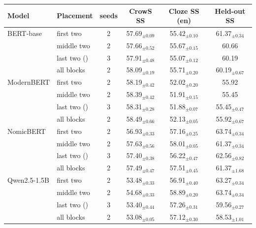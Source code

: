   \footnotesize\setlength{\tabcolsep}{4pt}
  \begin{tabular}{@{}llcccc@{}}
    \toprule
    Model & Placement & seeds & CrowS SS & Cloze SS (en) & Held-out SS \\
    \midrule
    BERT-base & first two & 2 & 57.69$_{\pm 0.09}$ & 55.42$_{\pm 0.10}$ & 61.37$_{\pm 0.34}$ \\
     & middle two & 2 & 57.66$_{\pm 0.52}$ & 55.67$_{\pm 0.15}$ & 60.66 \\
     & last two (\PEAT{}) & 3 & 57.91$_{\pm 0.48}$ & 55.07$_{\pm 0.12}$ & 60.19 \\
     & all blocks & 2 & 58.09$_{\pm 0.19}$ & 55.71$_{\pm 0.20}$ & 60.19$_{\pm 0.67}$ \\
    \midrule
    ModernBERT & first two & 2 & 58.19$_{\pm 0.42}$ & 52.02$_{\pm 0.20}$ & 55.92 \\
     & middle two & 2 & 58.39$_{\pm 0.42}$ & 51.91$_{\pm 0.15}$ & 55.45 \\
     & last two (\PEAT{}) & 3 & 58.31$_{\pm 0.28}$ & 51.88$_{\pm 0.07}$ & 55.45$_{\pm 0.47}$ \\
     & all blocks & 2 & 58.49$_{\pm 0.66}$ & 52.13$_{\pm 0.05}$ & 55.92$_{\pm 0.67}$ \\
    \midrule
    NomicBERT & first two & 2 & 56.93$_{\pm 0.33}$ & 57.16$_{\pm 0.25}$ & 63.74$_{\pm 0.34}$ \\
     & middle two & 2 & 57.63$_{\pm 0.56}$ & 58.01$_{\pm 0.05}$ & 61.37$_{\pm 0.34}$ \\
     & last two (\PEAT{}) & 3 & 57.40$_{\pm 0.38}$ & 56.22$_{\pm 0.47}$ & 62.56$_{\pm 0.82}$ \\
     & all blocks & 2 & 57.49$_{\pm 0.47}$ & 57.51$_{\pm 0.45}$ & 61.37$_{\pm 1.68}$ \\
    \midrule
    Qwen2.5-1.5B & first two & 2 & 53.48$_{\pm 0.33}$ & 56.91$_{\pm 0.40}$ & 63.27$_{\pm 0.34}$ \\
     & middle two & 2 & 54.68$_{\pm 0.33}$ & 58.89$_{\pm 0.20}$ & 63.74$_{\pm 0.34}$ \\
     & last two (\PEAT{}) & 3 & 53.40$_{\pm 0.44}$ & 57.26$_{\pm 0.31}$ & 59.56$_{\pm 0.27}$ \\
     & all blocks & 2 & 53.08$_{\pm 0.05}$ & 57.12$_{\pm 0.30}$ & 58.53$_{\pm 1.01}$ \\
    \bottomrule
  \end{tabular}
